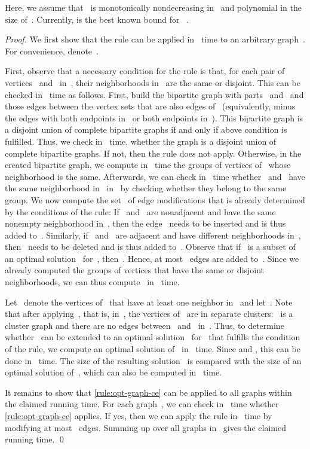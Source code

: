 \documentclass[envcountsame,numbook,smallextended]{svjour3}
\numberwithin{equation}{section}
\numberwithin{figure}{section}
\begin{document}
Here, we assume that
~is monotonically nondecreasing in~
and polynomial in the size of~. Currently,
 is the best known bound
for ~\cite{Boeck12}.
\begin{proof} 
  We first show that the rule can be applied
  in ~time
  to an arbitrary graph~.
  For convenience, denote~.

  First, observe that a necessary condition for the rule is that, for each pair of
  vertices~ and~ in~, their neighborhoods in~ are the same or disjoint.
 This can be checked in
  ~time as follows.  First, build the bipartite graph with
  parts~ and~ and those edges between the vertex sets that are also edges of~
  (equivalently,  minus the edges with both endpoints in~ or both
  endpoints in~). This bipartite graph is a disjoint union of complete bipartite
  graphs if and only if above condition is fulfilled. Thus, we check in~ time,
  whether the graph is a disjoint union of complete bipartite graphs. If not, then the
  rule does not apply.
  Otherwise, in the created bipartite graph,
  we compute in ~time
  the groups of vertices of~ whose neighborhood is the same.
  Afterwards, we can check in ~time
  whether ~and~ have the same neighborhood in~ in~
  by checking whether they belong to the same group.
  We now compute the set~ of
  edge modifications that is already determined by the conditions of the rule: If~
  and~ are nonadjacent and have the same nonempty neighborhood in~, then the
  edge~ needs to be inserted and is thus added to~.  Similarly, if~
  and~ are adjacent and have different neighborhoods in~, then~ needs to be
  deleted and is thus added to~. Observe that if~ is a subset of an optimal
  solution~ for~, then~. Hence, at most~ edges are added
  to~. Since we already computed the groups of vertices that have the same or disjoint
  neighborhoods, we can thus compute~ in~ time.

  Let~ denote the vertices of~ that have at least one neighbor in~ and
  let~. Note that after applying~, that is,
  in~, the vertices of~ are in separate clusters:
  ~is a cluster graph and
  there are no edges between~ and~ in~.
  Thus, to determine whether~ can be extended
  to an optimal solution~ for~
  that fulfills the condition of the rule,
  we compute an optimal solution of~ in
  ~time.
  Since  and , this can be done in
  ~time. The size of the resulting solution~ is compared with the size of
  an optimal solution of~, which can also be computed in ~time.

  It remains to show that \cref{rule:opt-graph-ce}
  can be applied to all graphs
  within the claimed running time.
  For each graph~,
  we can check
  in ~time
  whether \cref{rule:opt-graph-ce} applies.
  If yes,  then we can apply the rule in ~time
  by modifying at most ~edges.
  Summing up over all graphs in~
  gives the claimed running time.
\qed\end{proof}
\end{document}
